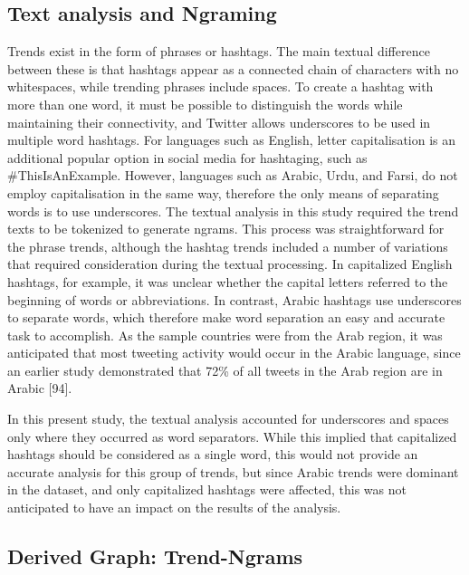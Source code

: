 \documentclass[conference]{IEEEtran}
\begin{document}
\subsection{Text analysis and Ngraming}
Trends exist in the form of phrases or hashtags. The main textual 
difference between these is that hashtags appear as a connected 
chain of characters with no whitespaces, while trending phrases include 
spaces. To create a hashtag with more than one word, it must be possible 
to distinguish the words while maintaining their connectivity, and Twitter 
allows underscores to be used in multiple word hashtags. For languages 
such as English, letter capitalisation is an additional popular option in social 
media for hashtaging, such as \#ThisIsAnExample. However, languages 
such as Arabic, Urdu, and Farsi, do not employ capitalisation in the same 
way, therefore the only means of separating words is to use underscores. 
The textual analysis in this study required the trend texts to be tokenized 
to generate ngrams. This process was straightforward for the phrase trends, 
although the hashtag trends included a number of variations that required 
consideration during the textual processing. In capitalized English hashtags, 
for example, it was unclear whether the capital letters referred to the 
beginning of words or abbreviations. In contrast, Arabic hashtags use 
underscores to separate words, which therefore make word separation an 
easy and accurate task to accomplish. As the sample countries were from the 
Arab region, it was anticipated that most tweeting activity would occur in the 
Arabic language, since an earlier study demonstrated that 72\% of all tweets 
in the Arab region are in Arabic [94]. 

In this present study, the textual analysis accounted for underscores and spaces 
only where they occurred as word separators. While this implied that capitalized 
hashtags should be considered as a single word, this would not provide an accurate 
analysis for this group of trends, but since Arabic trends were dominant in the dataset, 
and only capitalized hashtags were affected, this was not anticipated to have an impact 
on the results of the analysis.


\subsection{Derived Graph: Trend-Ngrams}
\end{document}
